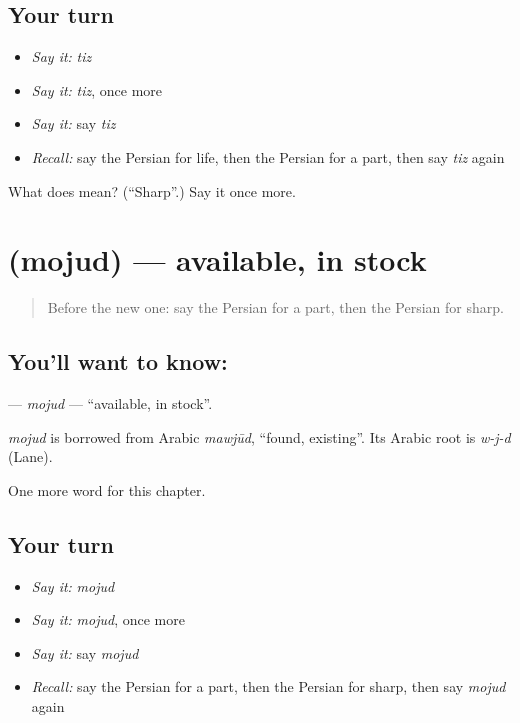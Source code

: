 \subsection*{Your turn}
\begin{itemize}
\raggedright
  \item \emph{Say it:} \emph{tiz}
  \item \emph{Say it:} \emph{tiz}, once more
  \item \emph{Say it:} say \emph{tiz}
  \item \emph{Recall:} say the Persian for life, then the Persian for a part, then say \emph{tiz} again
\end{itemize}

\begin{tcolorbox}[breakable,colback=teal!4,colframe=teal!35!black,title={Before you move on}]
What does  mean? (\textquotedblleft{}Sharp\textquotedblright{}.) Say it once more.
\end{tcolorbox}
\section[\texorpdfstring{\fa{موجود} (mojud)}{موجود (mojud)}]{ (mojud) — available, in stock}

\label{lesson:FA-C235-mojud}



\begin{quote}
Before the new one: say the Persian for a part, then the Persian for sharp.
\end{quote}

\subsection*{You'll want to know: }
\textbf{} — \emph{mojud} — \textquotedblleft{}available, in stock\textquotedblright{}.

\begin{cousinweb}
\emph{mojud} is borrowed from Arabic \emph{mawjūd}, \textquotedblleft{}found, existing\textquotedblright{}. Its Arabic root is \emph{w-j-d} (Lane).
\end{cousinweb}

\begin{grammarlens}[title={What you've built}]
One more word for this chapter.
\end{grammarlens}

\subsection*{Your turn}
\begin{itemize}
\raggedright
  \item \emph{Say it:} \emph{mojud}
  \item \emph{Say it:} \emph{mojud}, once more
  \item \emph{Say it:} say \emph{mojud}
  \item \emph{Recall:} say the Persian for a part, then the Persian for sharp, then say \emph{mojud} again
\end{itemize}

